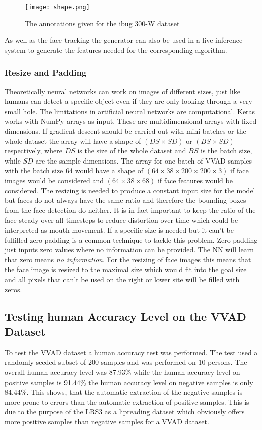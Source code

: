 \begin{figure}
  \centering
  \texttt{[image: shape.png]}
  \caption{The annotations given for the ibug 300-W dataset \cite{6755925}}
  \label{fig:shape}
\end{figure}

As well as the face tracking the generator can also be used in a live inference system to generate the features needed for the corresponding algorithm.


\subsubsection{Resize and Padding}\label{ssec:reAndPad}
Theoretically neural networks can work on images of different sizes, just like humans can detect a specific object even if they are only looking through a very small hole.
The limitations in artificial neural networks are computational.
Keras works with NumPy arrays as input. These are multidimensional arrays with fixed dimensions.
If gradient descent should be carried out with mini batches or the whole dataset the array will have a shape of $(DS \times SD)$ or $(BS \times SD)$ respectively, where $DS$ is the size of the whole dataset and $BS$ is the batch size, while $SD$ are the sample dimensions. The array for one batch of VVAD samples with the batch size 64 would have a shape of $(64 \times 38 \times 200 \times 200 \times 3)$ if face images would be considered and $(64 \times 38 \times 68)$ if face features would be considered.
The resizing is needed to produce a constant input size for the model but faces do not always have the same ratio and therefore the bounding boxes from the face detection do neither.
It is in fact important to keep the ratio of the face steady over all timesteps to reduce distortion over time which could be interpreted as mouth movement.
If a specific size is needed but it can't be fulfilled zero padding is a common technique to tackle this problem.
Zero padding just inputs zero values where no information can be provided. The NN will learn that zero means \emph{no information}.
For the resizing of face images this means that the face image is resized to the maximal size which would fit into the goal size and all pixels that can't be used on the right or lower site will be filled with zeros.




\subsection{Testing human Accuracy Level on the VVAD Dataset}\label{ssec:VVADHACL}
To test the VVAD dataset a human accuracy test was performed.
The test used a randomly seeded subset of 200 samples and was performed on 10 persons.
The overall human accuracy level was 87.93\% while the human accuracy level on positive samples is 91.44\% the human accuracy level on negative samples is only 84.44\%.
This shows, that the automatic extraction of the negative samples is more prone to errors than the automatic extraction of positive samples. This is due to the purpose of the LRS3 as a lipreading dataset which obviously offers more positive samples than negative samples for a VVAD dataset. 

